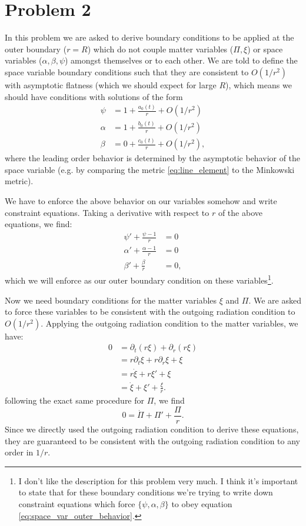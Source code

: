 \documentclass[12pt]{article}
\numberwithin{equation}{section}
\begin{document}
\section{Problem 2}
In this problem we are asked to derive boundary conditions to be applied at the outer boundary ($r = R$) which do not couple matter variables ($\Pi, \xi$) or space variables ($\alpha, \beta, \psi$) amongst themselves or to each other.  We are told to define the space variable boundary conditions such that they are consistent to $O(1/r^2)$ with asymptotic flatness (which we should expect for large $R$), which means we should have conditions with solutions of the form
\begin{equation} \label{eq:space_var_outer_behavior}
\begin{aligned}
\psi   &= 1 + \frac{a_0(t)}{r} + O(1/r^2) \\
\alpha &= 1 + \frac{b_0(t)}{r} + O(1/r^2) \\
\beta  &= 0 + \frac{c_0(t)}{r} + O(1/r^2),
\end{aligned}
\end{equation}
where the leading order behavior is determined by the asymptotic behavior of the space variable (e.g. by comparing the metric \ref{eq:line_element} to the Minkowski metric).

We have to enforce the above behavior on our variables somehow and write constraint equations.  Taking a derivative with respect to $r$ of the above equations, we find:
\begin{align}
\psi' + \frac{\psi - 1}{r}     &= 0 \\
\alpha' + \frac{\alpha - 1}{r} &= 0 \\
\beta' + \frac{\beta}{r}       &= 0,
\end{align} 
which we will enforce as our outer boundary condition on these variables\footnote{I don't like the description for this problem very much.  I think it's important to state that for these boundary conditions we're trying to write down constraint equations which force $\{\psi, \alpha, \beta\}$ to obey equation \ref{eq:space_var_outer_behavior}.}.

Now we need boundary conditions for the matter variables $\xi$ and $\Pi$.  We are asked to force these variables to be consistent with the outgoing radiation condition to $O(1/r^2)$.  Applying the outgoing radiation condition to the matter variables, we have:
\begin{equation}
\begin{aligned}
0 &= \partial_t (r \xi) + \partial_r (r \xi) \\
&= r \partial_t \xi + r \partial_r \xi + \xi \\
&= r \dot{\xi} + r \xi' + \xi \\
&= \dot{\xi} + \xi' + \frac{\xi}{r}.
\end{aligned}
\end{equation}
following the exact same procedure for $\Pi$, we find
\begin{equation}
0 = \dot{\Pi} + \Pi' + \frac{\Pi}{r}.
\end{equation}
Since we directly used the outgoing radiation condition to derive these equations, they are guaranteed to be consistent with the outgoing radiation condition to any order in $1/r$.
\end{document}
